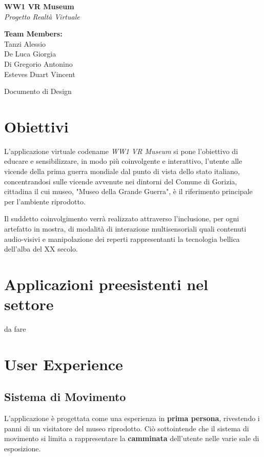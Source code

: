 \documentclass[10pt, openany]{article}
\begin{document}
  \begin{titlepage}
    \begin{center}
      {\Huge\textbf{WW1 VR Museum}} \\[1cm]
      {\Large\textit{Progetto Realt\`a Virtuale}} \\[2cm]
      \vfill
    \end{center}
    \hfill
    \begin{minipage}[t]{0.4\textwidth}
      \raggedleft
      \textbf{Team Members:} \\
      Tanzi	Alessio \\
      De Luca Giorgia \\
      Di Gregorio	Antonino \\
      Esteves Duart Vincent \\
    \end{minipage}
    \vfill
    \begin{center}
      {\large Documento di Design}
    \end{center}
  \end{titlepage}
  \tableofcontents
  \section{Obiettivi}
    L'applicazione virtuale codename \textit{WW1 VR Museum} si pone l'obiettivo di educare e sensibilizzare, in modo
    pi\`u coinvolgente e interattivo, l'utente alle vicende della prima guerra mondiale dal punto di vista dello stato italiano, 
    concentrandosi sulle vicende avvenute nei dintorni del Comune di Gorizia, cittadina il cui museo, "Museo della Grande Guerra", \`e 
    il riferimento principale per l'ambiente riprodotto.\par
    Il suddetto coinvolgimento verr\`a realizzato attraverso l'inclusione, per ogni artefatto in mostra, di modalit\`a di interazione
    multisensoriali quali contenuti audio-visivi e manipolazione dei reperti rappresentanti la tecnologia bellica dell'alba del XX secolo.
  \section{Applicazioni preesistenti nel settore}
    da fare
  \section{User Experience}\label{vr:ux}
    \subsection{Sistema di Movimento}
    L'applicazione \`e progettata come una esperienza in \textbf{prima persona}, rivestendo i panni di un visitatore del museo riprodotto.
    Ci\`o sottointende che il sistema di movimento si limita a rappresentare la \textbf{camminata} dell'utente nelle varie sale di esposizione.\par
\end{document}
